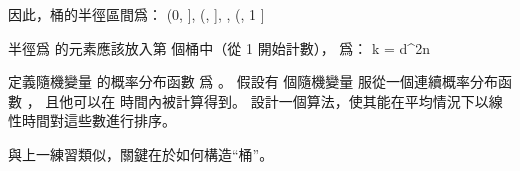 因此，桶的半徑區間爲：
\startformula
\left(0,  \right],
   \left(, \right], \cdots,
   \left(, 1 \right]
\stopformula

半徑爲  的元素應該放入第  個桶中（從 1 開始計數），  爲：
\startformula
k = \left\lceil d^2n \right\rceil
\stopformula
\stopANSWER

\startEXERCISE\DIFFICULT
定義隨機變量  的{\EMP 概率分布函數}  爲 。
假設有  個隨機變量  服從一個連續概率分布函數 ，
且他可以在  時間內被計算得到。
設計一個算法，使其能在平均情況下以線性時間對這些數進行排序。
\stopEXERCISE

\startANSWER
與上一練習類似，關鍵在於如何構造“桶”。
\stopANSWER

\stopsection
